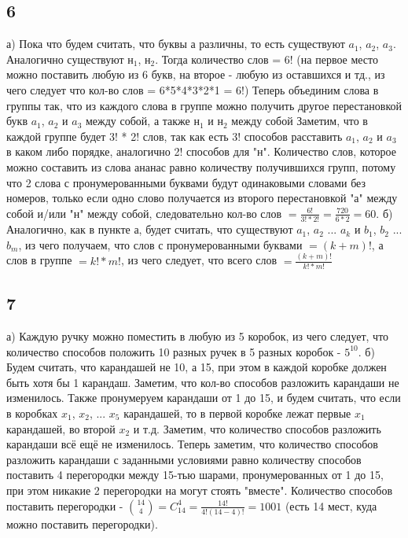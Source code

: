 		\subsection{6}
		а)\newline
		Пока что будем считать, что буквы а различны, то есть существуют $a_1$, $a_2$, $a_3$. Аналогично существуют $\text{н}_1$, $\text{н}_2$.
		Тогда количество слов = 6! (на первое место можно поставить любую из 6 букв, на второе - любую из оставшихся и тд., из чего следует что кол-во слов = 6*5*4*3*2*1 = 6!)
		\newline
		Теперь объединим слова в группы так, что из каждого слова в группе можно получить другое перестановкой букв $a_1$, $a_2$ и $a_3$ между собой, а также $\text{н}_1$ и $\text{н}_2$ между собой
		Заметим, что в каждой группе будет 3! * 2! слов, так как есть 3! способов расставить $a_1$, $a_2$ и $a_3$ в каком либо порядке, аналогично 2! способов для "н".
		\newline
		Количество слов, которое можно составить из слова ананас равно количеству получившихся групп, потому что 2 слова с пронумерованными буквами будут одинаковыми словами без номеров, только если одно слово получается из второго перестановкой "а" между собой и/или "н" между собой, следовательно кол-во слов $= \frac{6!}{3! * 2!} = \frac{720}{6*2} = 60$.
		\newline
		б)\newline		
		Аналогично, как в пункте а, будет считать, что существуют $a_1$, $a_2$ ... $a_k$ и $b_1$, $b_2$ ... $b_m$, из чего получаем, что слов с пронумерованными буквами $= (k+m)!$, а слов в группе $= k!*m!$, 
		из чего следует, что всего слов $= \frac{(k+m)!}{k!*m!}$
		
		\subsection{7}
		а)\newline
		Каждую ручку можно поместить в любую из 5 коробок, из чего следует, что количество способов положить 10 разных ручек в 5 разных коробок - $5^{10}$.
		\newline		
		б)\newline
		Будем считать, что карандашей не 10, а 15, при этом в каждой коробке должен быть хотя бы 1 карандаш. Заметим, что кол-во способов разложить карандаши не изменилось.
		Также пронумеруем карандаши от 1 до 15, и будем считать, что если в коробках $x_1$, $x_2$, ... $x_5$ карандашей, то в первой коробке лежат первые $x_1$ карандашей, во второй $x_2$ и т.д. Заметим, что количество способов разложить карандаши всё ещё не изменилось.
		\newline
		Теперь заметим, что количество способов разложить карандаши с заданными условиями равно количеству способов поставить 4 перегородки между 15-тью шарами, пронумерованных от 1 до 15, при этом никакие 2 перегородки на могут стоять "вместе". Количество способов поставить перегородки - ${14\choose 4} = C_{14}^4 = \frac{14!}{4!(14-4)!} = 1001$ (есть 14 мест, куда можно поставить перегородки).
		
